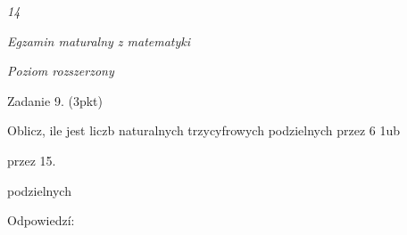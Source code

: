 \documentclass[a4paper,12pt]{article}
\begin{document}
{\it 14}

{\it Egzamin maturalny z matematyki}

{\it Poziom rozszerzony}

Zadanie 9. (3pkt)

Oblicz, ile jest liczb naturalnych trzycyfrowych podzielnych przez 6 1ub

przez 15.

podzielnych

Odpowiedzí:
\end{document}
